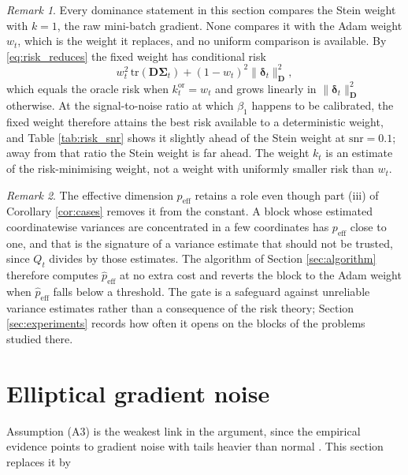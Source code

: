 \documentclass[a4paper,fleqn]{cas-dc}
\theoremstyle{plain}
\theoremstyle{definition}
\theoremstyle{remark}
\newtheorem{remark}{Remark}
\newenvironment{revblock}{}{}
\newcommand{\peff}{p_{\mathrm{eff}}}
\newcommand{\tr}{\mathrm{tr}}
\begin{document}
\begin{remark}
\label{rem:benchmark}
Every dominance statement in this section compares the Stein weight with $k=1$, the raw mini-batch gradient. None compares it with the Adam weight $w_t$, which is the weight it replaces, and no uniform comparison is available. By \eqref{eq:risk_reduces} the fixed weight has conditional risk
\begin{equation}
\label{eq:fixed_risk}
w_t^{2}\,\tr(\bm D\bm\Sigma_t)+(1-w_t)^{2}\|\bm\delta_t\|^2_{\bm D},
\end{equation}
which equals the oracle risk when $k^{\mathrm{or}}_t=w_t$ and grows linearly in $\|\bm\delta_t\|^2_{\bm D}$ otherwise. At the signal-to-noise ratio at which $\beta_1$ happens to be calibrated, the fixed weight therefore attains the best risk available to a deterministic weight, and Table \ref{tab:risk_snr} shows it slightly ahead of the Stein weight at $\mathrm{snr}=0.1$; away from that ratio the Stein weight is far ahead. The weight $k_t$ is an estimate of the risk-minimising weight, not a weight with uniformly smaller risk than $w_t$.
\end{remark}

\begin{remark}
\label{rem:gate}
The effective dimension $\peff$ retains a role even though part (iii) of Corollary \ref{cor:cases} removes it from the constant. A block whose estimated coordinatewise variances are concentrated in a few coordinates has $\peff$ close to one, and that is the signature of a variance estimate that should not be trusted, since $Q_t$ divides by those estimates. The algorithm of Section \ref{sec:algorithm} therefore computes $\hat\peff$ at no extra cost and reverts the block to the Adam weight when $\hat\peff$ falls below a threshold. The gate is a safeguard against unreliable variance estimates rather than a consequence of the risk theory; Section \ref{sec:experiments} records how often it opens on the blocks of the problems studied there.
\end{remark}

\section{Elliptical gradient noise}
\label{sec:elliptical}

Assumption (A3) is the weakest link in the argument, since the empirical evidence points to gradient noise with tails heavier than normal \citep{simsekli2019, panigrahi2019, gurbuzbalaban2021}. This section replaces it by
\end{document}
